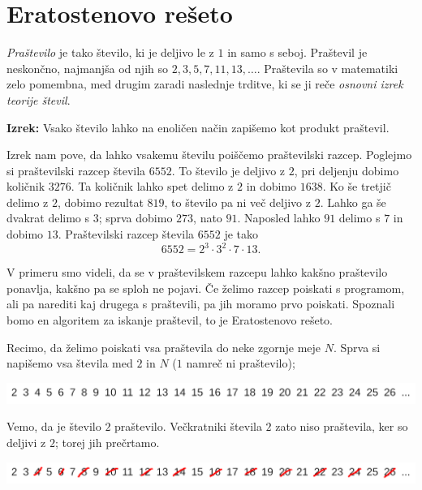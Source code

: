 \section{Eratostenovo rešeto}

\emph{Praštevilo} je tako število, ki je deljivo le z $1$ in samo s seboj.
Praštevil je neskončno, najmanjša od njih so $2, 3, 5, 7, 11, 13, \ldots$.
Praštevila so v matematiki zelo pomembna, med drugim zaradi naslednje trditve,
ki se ji reče \emph{osnovni izrek teorije števil}.

\vspace{0.5cm}

\textbf{Izrek:} Vsako število lahko na enoličen način zapišemo kot produkt
praštevil.

\begin{examples}
  Izrek nam pove, da lahko vsakemu številu poiščemo praštevilski razcep.
  Poglejmo si praštevilski razcep števila $6552$.
  To število je deljivo z $2$, pri deljenju dobimo količnik $3276$.
  Ta količnik lahko spet delimo z $2$ in dobimo $1638$.
  Ko še tretjič delimo z $2$, dobimo rezultat $819$, to število pa ni več
  deljivo z $2$.
  Lahko ga še dvakrat delimo s $3$; sprva dobimo $273$, nato $91$.
  Naposled lahko $91$ delimo s $7$ in dobimo $13$.
  Praštevilski razcep števila $6552$ je tako
  \[
	6552 = 2^3 \cdot 3^2 \cdot 7 \cdot 13.
  \]
\end{examples}

V primeru smo videli, da se v praštevilskem razcepu lahko kakšno praštevilo
ponavlja, kakšno pa se sploh ne pojavi.
Če želimo razcep poiskati s programom, ali pa narediti kaj drugega s praštevili,
pa jih moramo prvo poiskati.
Spoznali bomo en algoritem za iskanje praštevil, to je Eratostenovo rešeto.

Recimo, da želimo poiskati vsa praštevila do neke zgornje meje $N$.
Sprva si napišemo vsa števila med $2$ in $N$ ($1$ namreč ni praštevilo);

\includegraphics[width=\linewidth]{chapters/teorija-stevil/slike/reseto1}

Vemo, da je število $2$ praštevilo.
Večkratniki števila $2$ zato niso praštevila, ker so deljivi z $2$; torej jih
prečrtamo.

\includegraphics[width=\linewidth]{chapters/teorija-stevil/slike/reseto2}

